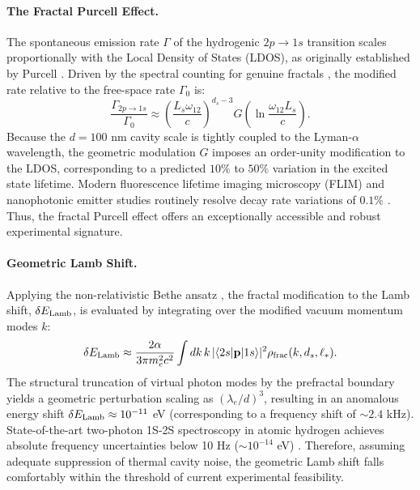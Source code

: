\documentclass[12pt,letterpaper]{article}
\begin{document}
\paragraph{The Fractal Purcell Effect.}
The spontaneous emission rate $\Gamma$ of the hydrogenic $2p \to 1s$ transition scales proportionally with the Local Density of States (LDOS), as originally established by Purcell \cite{purcell1946}. Driven by the spectral counting for genuine fractals \cite{akkermans2010}, the modified rate relative to the free-space rate $\Gamma_0$ is:
\begin{equation}
\frac{\Gamma_{2p \to 1s}}{\Gamma_0} \approx \left(\frac{L_s \omega_{12}}{c}\right)^{d_s-3} G\!\left(\ln \frac{\omega_{12} L_s}{c}\right).
\label{eq:Purcell_fractal}
\end{equation}
Because the $d = 100$ nm cavity scale is tightly coupled to the Lyman-$\alpha$ wavelength, the geometric modulation $G$ imposes an order-unity modification to the LDOS, corresponding to a predicted $10\%$ to $50\%$ variation in the excited state lifetime. Modern fluorescence lifetime imaging microscopy (FLIM) and nanophotonic emitter studies routinely resolve decay rate variations of $0.1\%$ \cite{lodahl2015}. Thus, the fractal Purcell effect offers an exceptionally accessible and robust experimental signature.

\paragraph{Geometric Lamb Shift.}
Applying the non-relativistic Bethe ansatz \cite{bethe1947}, the fractal modification to the Lamb shift, $\delta E_{\rm Lamb}$, is evaluated by integrating over the modified vacuum momentum modes $k$:
\begin{equation}
\delta E_{\rm Lamb} \approx \frac{2\alpha}{3\pi m_e^2 c^2} \int dk \, k \, |\langle 2s | \mathbf{p} | 1s \rangle|^2 \rho_{\rm frac}(k, d_s, \ell_*).
\label{eq:Lamb_fractal}
\end{equation}
The structural truncation of virtual photon modes by the prefractal boundary yields a geometric perturbation scaling as $(\lambda_e/d)^3$, resulting in an anomalous energy shift $\delta E_{\rm Lamb} \approx 10^{-11}$ eV (corresponding to a frequency shift of $\sim 2.4$ kHz). State-of-the-art two-photon 1S-2S spectroscopy in atomic hydrogen achieves absolute frequency uncertainties below 10 Hz ($\sim 10^{-14}$ eV) \cite{parthey2011}. Therefore, assuming adequate suppression of thermal cavity noise, the geometric Lamb shift falls comfortably within the threshold of current experimental feasibility.
\end{document}

